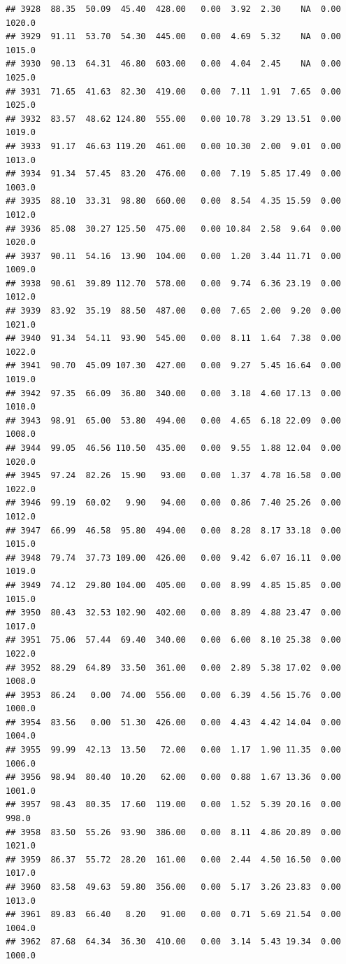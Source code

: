 \documentclass{article}\usepackage{graphicx, color}
\makeatletter
\newenvironment{kframe}{%
 \def\at@end@of@kframe{}%
 \ifinner\ifhmode%
  \def\at@end@of@kframe{\end{minipage}}%
  \begin{minipage}{\columnwidth}%
 \fi\fi%
 \def\FrameCommand##1{\hskip\@totalleftmargin \hskip-\fboxsep
 \colorbox{shadecolor}{##1}\hskip-\fboxsep
     \hskip-\linewidth \hskip-\@totalleftmargin \hskip\columnwidth}%
 \MakeFramed {\advance\hsize-\width
   \@totalleftmargin\z@ \linewidth\hsize
   \@setminipage}}%
 {\par\unskip\endMakeFramed%
 \at@end@of@kframe}
\newenvironment{knitrout}{}{} %
\makeatother
\begin{document}
\begin{knitrout}
\begin{kframe}
\begin{verbatim}
## 3928  88.35  50.09  45.40  428.00   0.00  3.92  2.30    NA  0.00 1020.0
## 3929  91.11  53.70  54.30  445.00   0.00  4.69  5.32    NA  0.00 1015.0
## 3930  90.13  64.31  46.80  603.00   0.00  4.04  2.45    NA  0.00 1025.0
## 3931  71.65  41.63  82.30  419.00   0.00  7.11  1.91  7.65  0.00 1025.0
## 3932  83.57  48.62 124.80  555.00   0.00 10.78  3.29 13.51  0.00 1019.0
## 3933  91.17  46.63 119.20  461.00   0.00 10.30  2.00  9.01  0.00 1013.0
## 3934  91.34  57.45  83.20  476.00   0.00  7.19  5.85 17.49  0.00 1003.0
## 3935  88.10  33.31  98.80  660.00   0.00  8.54  4.35 15.59  0.00 1012.0
## 3936  85.08  30.27 125.50  475.00   0.00 10.84  2.58  9.64  0.00 1020.0
## 3937  90.11  54.16  13.90  104.00   0.00  1.20  3.44 11.71  0.00 1009.0
## 3938  90.61  39.89 112.70  578.00   0.00  9.74  6.36 23.19  0.00 1012.0
## 3939  83.92  35.19  88.50  487.00   0.00  7.65  2.00  9.20  0.00 1021.0
## 3940  91.34  54.11  93.90  545.00   0.00  8.11  1.64  7.38  0.00 1022.0
## 3941  90.70  45.09 107.30  427.00   0.00  9.27  5.45 16.64  0.00 1019.0
## 3942  97.35  66.09  36.80  340.00   0.00  3.18  4.60 17.13  0.00 1010.0
## 3943  98.91  65.00  53.80  494.00   0.00  4.65  6.18 22.09  0.00 1008.0
## 3944  99.05  46.56 110.50  435.00   0.00  9.55  1.88 12.04  0.00 1020.0
## 3945  97.24  82.26  15.90   93.00   0.00  1.37  4.78 16.58  0.00 1022.0
## 3946  99.19  60.02   9.90   94.00   0.00  0.86  7.40 25.26  0.00 1012.0
## 3947  66.99  46.58  95.80  494.00   0.00  8.28  8.17 33.18  0.00 1015.0
## 3948  79.74  37.73 109.00  426.00   0.00  9.42  6.07 16.11  0.00 1019.0
## 3949  74.12  29.80 104.00  405.00   0.00  8.99  4.85 15.85  0.00 1015.0
## 3950  80.43  32.53 102.90  402.00   0.00  8.89  4.88 23.47  0.00 1017.0
## 3951  75.06  57.44  69.40  340.00   0.00  6.00  8.10 25.38  0.00 1022.0
## 3952  88.29  64.89  33.50  361.00   0.00  2.89  5.38 17.02  0.00 1008.0
## 3953  86.24   0.00  74.00  556.00   0.00  6.39  4.56 15.76  0.00 1000.0
## 3954  83.56   0.00  51.30  426.00   0.00  4.43  4.42 14.04  0.00 1004.0
## 3955  99.99  42.13  13.50   72.00   0.00  1.17  1.90 11.35  0.00 1006.0
## 3956  98.94  80.40  10.20   62.00   0.00  0.88  1.67 13.36  0.00 1001.0
## 3957  98.43  80.35  17.60  119.00   0.00  1.52  5.39 20.16  0.00  998.0
## 3958  83.50  55.26  93.90  386.00   0.00  8.11  4.86 20.89  0.00 1021.0
## 3959  86.37  55.72  28.20  161.00   0.00  2.44  4.50 16.50  0.00 1017.0
## 3960  83.58  49.63  59.80  356.00   0.00  5.17  3.26 23.83  0.00 1013.0
## 3961  89.83  66.40   8.20   91.00   0.00  0.71  5.69 21.54  0.00 1004.0
## 3962  87.68  64.34  36.30  410.00   0.00  3.14  5.43 19.34  0.00 1000.0

\end{verbatim}
\end{kframe}
\end{knitrout}
\end{document}

